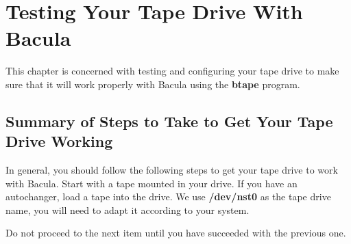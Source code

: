 
\section*{Testing Your Tape Drive With Bacula}
\label{_ChapterStart27}

This chapter is concerned with testing and configuring your tape drive to make
sure that it will work properly with Bacula using the {\bf btape} program. 
\label{summary}

\subsection*{Summary of Steps to Take to Get Your Tape Drive Working}

In general, you should follow the following steps to get your tape drive to
work with Bacula. Start with a tape mounted in your drive. If you have an
autochanger, load a tape into the drive. We use {\bf /dev/nst0} as the tape
drive name, you will need to adapt it according to your system. 

Do not proceed to the next item until you have succeeded with the previous
one. 


